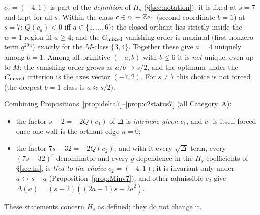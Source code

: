 \begin{proposition}[Status of $c_2=(-4,1)$]\label{prop:c2status7}
$c_2=(-4,1)$ is part of the \emph{definition} of $H_s$ (\S\ref{sec:notation}): it is fixed at $s=7$ and kept for all $s$. Within the class $c\in c_1+\mathbb{Z} e_1$ (second coordinate $b=1$) at $s=7$: $Q(c_a)<0$ iff $a\in\{1,\dots,6\}$; the closed orthant lies strictly inside the $w=1$ region iff $a\ge4$; and the $C_{\mathrm{mixed}}$ vanishing order is maximal (first nonzero term $q^{294}$) exactly for the $M$-class $\{3,4\}$. Together these give $a=4$ uniquely among $b=1$. Among all primitive $(-a,b)$ with $b\le6$ it is \emph{not} unique, even up to $M$: the vanishing order grows as $a/b\to s/2$, and the optimum under the $C_{\mathrm{mixed}}$ criterion is the axes vector $(-7,2)$. For $s\ne7$ this choice is not forced (the deepest $b=1$ class is $a\approx s/2$).
\end{proposition}
\begin{remark}\label{rem:intrinsic7}
Combining Propositions~\ref{prop:delta7}--\ref{prop:c2status7} (all Category~A):
\begin{itemize}[leftmargin=2em]
\item the factor $s-2=-2Q(c_1)$ of $\Delta$ is \emph{intrinsic given $c_1$}, and $c_1$ is itself forced once one wall is the orthant edge $n=0$;
\item the factor $7s-32=-2Q(c_2)$, and with it every $\sqrt\Delta$ term, every $(7s-32)^r$ denominator and every $g$-dependence in the $H_s$ coefficients of \S\ref{sec:hs}, is \emph{tied to the choice} $c_2=(-4,1)$; it is invariant only under $a\leftrightarrow s-a$ (Proposition~\ref{prop:Minv7}), and other admissible $c_2$ give $\Delta(a)=(s-2)((2a-1)s-2a^2)$.
\end{itemize}
These statements concern $H_s$ as defined; they do not change it.
\end{remark}

